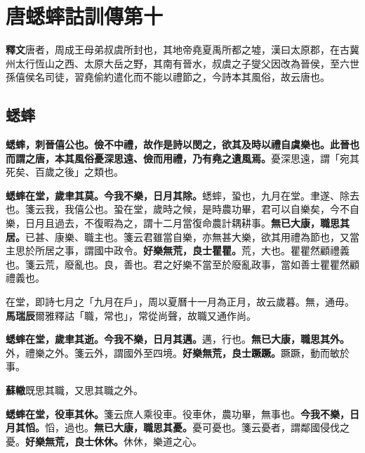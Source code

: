 \chapter{唐蟋蟀詁訓傳第十}

\begin{quoting}\textbf{釋文}唐者，周成王母弟叔虞所封也，其地帝堯夏禹所都之墟，漢曰太原郡，在古冀州太行恆山之西、太原大岳之野，其南有晉水，叔虞之子燮父因改為晉侯，至六世孫僖侯名司徒，習堯偷約遣化而不能以禮節之，今詩本其風俗，故云唐也。\end{quoting}

\section{蟋蟀}


\textbf{蟋蟀，刺晉僖公也。儉不中禮，故作是詩以閔之，欲其及時以禮自虞樂也。此晉也而謂之唐，本其風俗憂深思遠、儉而用禮，乃有堯之遺風焉。}{\footnotesize 憂深思遠，謂「宛其死矣、百歲之後」之類也。}

\textbf{蟋蟀在堂，歲聿其莫。今我不樂，日月其除。}{\footnotesize 蟋蟀，蛩也，九月在堂。聿遂、除去也。箋云我，我僖公也。蛩在堂，歲時之候，是時農功畢，君可以自樂矣，今不自樂，日月且過去，不復暇為之，謂十二月當復命農計耦耕事。}\textbf{無已大康，職思其居。}{\footnotesize 已甚、康樂、職主也。箋云君雖當自樂，亦無甚大樂，欲其用禮為節也，又當主思於所居之事，謂國中政令。}\textbf{好樂無荒，良士瞿瞿。}{\footnotesize 荒，大也。瞿瞿然顧禮義也。箋云荒，廢亂也。良，善也。君之好樂不當至於廢亂政事，當如善士瞿瞿然顧禮義也。}

\begin{quoting}在堂，即詩七月之「九月在戶」，周以夏曆十一月為正月，故云歲暮。無，通毋。\textbf{馬瑞辰}爾雅釋詁「職，常也」，常從尚聲，故職又通作尚。\end{quoting}

\textbf{蟋蟀在堂，歲聿其逝。今我不樂，日月其邁。}{\footnotesize 邁，行也。}\textbf{無已大康，職思其外。}{\footnotesize 外，禮樂之外。箋云外，謂國外至四境。}\textbf{好樂無荒，良士蹶蹶。}{\footnotesize 蹶蹶，動而敏於事。}

\begin{quoting}\textbf{蘇轍}既思其職，又思其職之外。\end{quoting}

\textbf{蟋蟀在堂，役車其休。}{\footnotesize 箋云庶人乘役車。役車休，農功畢，無事也。}\textbf{今我不樂，日月其慆。}{\footnotesize 慆，過也。}\textbf{無已大康，職思其憂。}{\footnotesize 憂可憂也。箋云憂者，謂鄰國侵伐之憂。}\textbf{好樂無荒，良士休休。}{\footnotesize 休休，樂道之心。}

